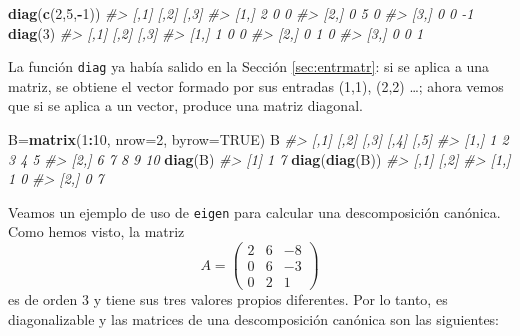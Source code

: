 \documentclass[
]{book}
\newenvironment{Shaded}{\begin{snugshade}}{\end{snugshade}}
\newcommand{\CommentTok}[1]{\textcolor[rgb]{0.56,0.35,0.01}{\textit{#1}}}
\newcommand{\DataTypeTok}[1]{\textcolor[rgb]{0.13,0.29,0.53}{#1}}
\newcommand{\DecValTok}[1]{\textcolor[rgb]{0.00,0.00,0.81}{#1}}
\newcommand{\KeywordTok}[1]{\textcolor[rgb]{0.13,0.29,0.53}{\textbf{#1}}}
\newcommand{\NormalTok}[1]{#1}
\newcommand{\OperatorTok}[1]{\textcolor[rgb]{0.81,0.36,0.00}{\textbf{#1}}}
\newcommand{\OtherTok}[1]{\textcolor[rgb]{0.56,0.35,0.01}{#1}}
\theoremstyle{definition}
\theoremstyle{definition}
\theoremstyle{definition}
\theoremstyle{remark}
\begin{document}
\begin{Shaded}
\begin{Highlighting}[]
\KeywordTok{diag}\NormalTok{(}\KeywordTok{c}\NormalTok{(}\DecValTok{2}\NormalTok{,}\DecValTok{5}\NormalTok{,}\OperatorTok{{-}}\DecValTok{1}\NormalTok{))}
\CommentTok{\#\textgreater{}      [,1] [,2] [,3]}
\CommentTok{\#\textgreater{} [1,]    2    0    0}
\CommentTok{\#\textgreater{} [2,]    0    5    0}
\CommentTok{\#\textgreater{} [3,]    0    0   {-}1}
\KeywordTok{diag}\NormalTok{(}\DecValTok{3}\NormalTok{)}
\CommentTok{\#\textgreater{}      [,1] [,2] [,3]}
\CommentTok{\#\textgreater{} [1,]    1    0    0}
\CommentTok{\#\textgreater{} [2,]    0    1    0}
\CommentTok{\#\textgreater{} [3,]    0    0    1}
\end{Highlighting}
\end{Shaded}

La función \texttt{diag} ya había salido en la Sección \ref{sec:entrmatr}: si se aplica a una matriz, se obtiene el vector formado por sus entradas (1,1), (2,2) \ldots; ahora vemos que si se aplica a un vector, produce una matriz diagonal.

\begin{Shaded}
\begin{Highlighting}[]
\NormalTok{B=}\KeywordTok{matrix}\NormalTok{(}\DecValTok{1}\OperatorTok{:}\DecValTok{10}\NormalTok{, }\DataTypeTok{nrow=}\DecValTok{2}\NormalTok{, }\DataTypeTok{byrow=}\OtherTok{TRUE}\NormalTok{)}
\NormalTok{B}
\CommentTok{\#\textgreater{}      [,1] [,2] [,3] [,4] [,5]}
\CommentTok{\#\textgreater{} [1,]    1    2    3    4    5}
\CommentTok{\#\textgreater{} [2,]    6    7    8    9   10}
\KeywordTok{diag}\NormalTok{(B)}
\CommentTok{\#\textgreater{} [1] 1 7}
\KeywordTok{diag}\NormalTok{(}\KeywordTok{diag}\NormalTok{(B))}
\CommentTok{\#\textgreater{}      [,1] [,2]}
\CommentTok{\#\textgreater{} [1,]    1    0}
\CommentTok{\#\textgreater{} [2,]    0    7}
\end{Highlighting}
\end{Shaded}

Veamos un ejemplo de uso de \texttt{eigen} para calcular una descomposición canónica.
Como hemos visto, la matriz
\[
A=\left(\begin{array}{ccc}2 & 6 & -8 \\ 0 & 6 & -3 \\ 0 & 2 & 1\end{array}
\right)
\]
es de orden 3 y tiene sus tres valores propios diferentes. Por lo tanto, es diagonalizable y las matrices de una descomposición canónica son las siguientes:
\end{document}
